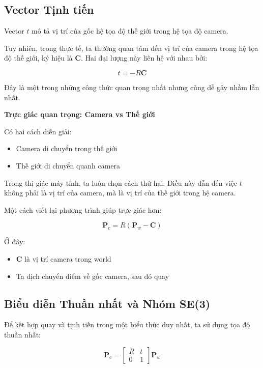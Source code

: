 \subsection{Vector Tịnh tiến}
\label{subsec:translation_vector}

Vector $t$ mô tả vị trí của gốc hệ tọa độ thế giới trong hệ tọa độ camera.

Tuy nhiên, trong thực tế, ta thường quan tâm đến vị trí của camera trong hệ tọa độ thế giới, ký hiệu là $\mathbf{C}$. Hai đại lượng này liên hệ với nhau bởi:

\[
t = -R \mathbf{C}
\]

Đây là một trong những công thức quan trọng nhất nhưng cũng dễ gây nhầm lẫn nhất.

\begin{mdframed}[style=infobox]
	\textbf{Trực giác quan trọng: Camera vs Thế giới}
	
	Có hai cách diễn giải:
	\begin{itemize}
		\item Camera di chuyển trong thế giới
		\item Thế giới di chuyển quanh camera
	\end{itemize}
	
	Trong thị giác máy tính, ta luôn chọn cách thứ hai. Điều này dẫn đến việc $t$ không phải là vị trí của camera, mà là vị trí của thế giới trong hệ camera.
\end{mdframed}

Một cách viết lại phương trình giúp trực giác hơn:

\[
\mathbf{P}_c = R(\mathbf{P}_w - \mathbf{C})
\]

Ở đây:
\begin{itemize}
	\item $\mathbf{C}$ là vị trí camera trong world
	\item Ta dịch chuyển điểm về gốc camera, sau đó quay
\end{itemize}

\subsection{Biểu diễn Thuần nhất và Nhóm SE(3)}
\label{subsec:se3_representation}

Để kết hợp quay và tịnh tiến trong một biểu thức duy nhất, ta sử dụng tọa độ thuần nhất:

\[
\mathbf{P}_c =
\begin{bmatrix}
	R & t \\
	0 & 1
\end{bmatrix}
\mathbf{P}_w
\]

